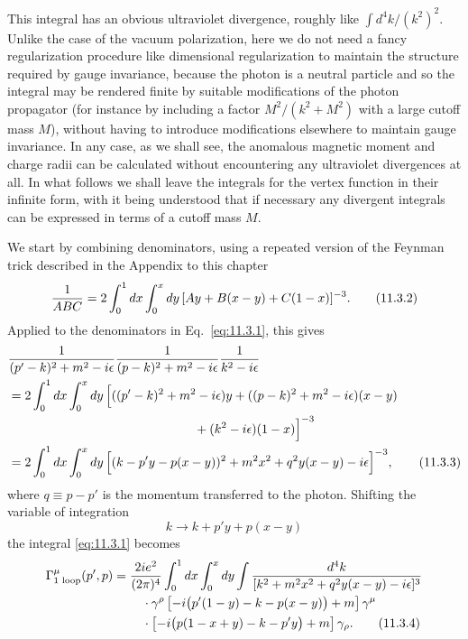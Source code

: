 This integral has an obvious ultraviolet divergence, roughly like
$\int d^4k/(k^2)^2$. Unlike the case of the vacuum polarization, here we do
not need a fancy regularization procedure like dimensional regularization to
maintain the structure required by gauge invariance, because the photon is a
neutral particle and so the integral may be rendered finite by suitable
modifications of the photon propagator (for instance by including a factor
$M^2/(k^2+M^2)$ with a large cutoff mass $M$), without having to introduce
modifications elsewhere to maintain gauge invariance. In any case, as we
shall see, the anomalous magnetic moment and charge radii can be calculated
without encountering any ultraviolet divergences at all. In what follows we
shall leave the integrals for the vertex function in their infinite form,
with it being understood that if necessary any divergent integrals can be
expressed in terms of a cutoff mass $M$.

We start by combining denominators, using a repeated version of the Feynman
trick described in the Appendix to this chapter
\begin{equation}
{1\over ABC}=2\int_0^1dx\int_0^xdy\,
 [Ay+B(x-y)+C(1-x)]^{-3}.
\tag{11.3.2}\label{eq:11.3.2}
\end{equation}
Applied to the denominators in Eq.~\eqref{eq:11.3.1}, this gives
\begin{align}
&{1\over(p'-k)^2+m^2-i\epsilon}
 {1\over(p-k)^2+m^2-i\epsilon}{1\over k^2-i\epsilon}
\notag\\
&=2\int_0^1dx\int_0^xdy\,
 \Bigl[((p'-k)^2+m^2-i\epsilon)y
 +((p-k)^2+m^2-i\epsilon)(x-y)\notag\\
&\hspace{52mm}+(k^2-i\epsilon)(1-x)\Bigr]^{-3}
\notag\\
&=2\int_0^1dx\int_0^xdy\,
 \Bigl[(k-p'y-p(x-y))^2+m^2x^2+q^2y(x-y)-i\epsilon\Bigr]^{-3},
\tag{11.3.3}\label{eq:11.3.3}
\end{align}
where $q\equiv p-p'$ is the momentum transferred to the photon. Shifting the
variable of integration
\[
k\longrightarrow k+p'y+p(x-y)
\]
the integral \eqref{eq:11.3.1} becomes
\begin{align}
\Gamma^\mu_{\text{1 loop}}(p',p)={}&{2ie^2\over(2\pi)^4}
 \int_0^1dx\int_0^xdy\int
 {d^4k\over[k^2+m^2x^2+q^2y(x-y)-i\epsilon]^3}\notag\\
&\quad\cdot\gamma^\rho
 \left[-i\bigl(\sl{p}'(1-y)-\sl{k}-\sl{p}(x-y)\bigr)+m\right]\gamma^\mu
\notag\\
&\quad\cdot
 \left[-i\bigl(\sl{p}(1-x+y)-\sl{k}-\sl{p}'y\bigr)+m\right]\gamma_\rho.
\tag{11.3.4}\label{eq:11.3.4}
\end{align}

